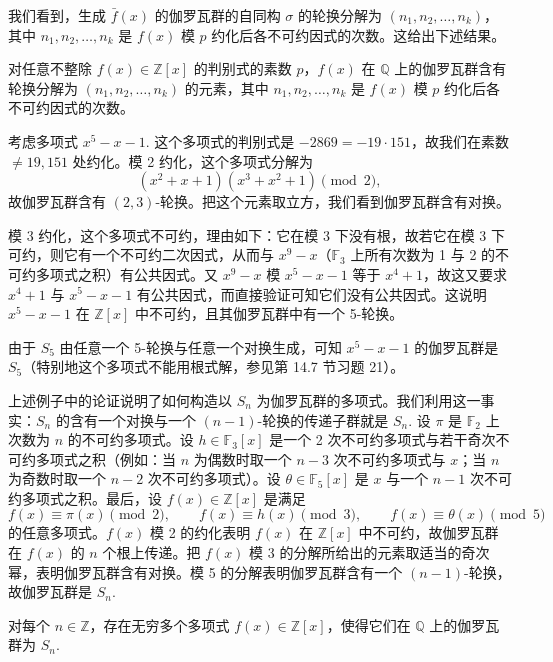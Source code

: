 我们看到，生成 \(\bar f(x)\) 的伽罗瓦群的自同构 \(\sigma\) 的轮换分解为 \((n_1, n_2, \ldots, n_k)\)，其中 \(n_1, n_2, \ldots, n_k\) 是 \(f(x)\) 模 \(p\) 约化后各不可约因式的次数。这给出下述结果。

\begin{corollary}\label{cor:14.41}
对任意不整除 \(f(x) \in \mathbb{Z}[x]\) 的判别式的素数 \(p\)，\(f(x)\) 在 \(\mathbb{Q}\) 上的伽罗瓦群含有轮换分解为 \((n_1, n_2, \ldots, n_k)\) 的元素，其中 \(n_1, n_2, \ldots, n_k\) 是 \(f(x)\) 模 \(p\) 约化后各不可约因式的次数。
\end{corollary}

\begin{example}
考虑多项式 \(x^5-x-1\). 这个多项式的判别式是 \(-2869 = -19\cdot151\)，故我们在素数 \(\neq 19, 151\) 处约化。模 2 约化，这个多项式分解为
\[
(x^2+x+1)(x^3+x^2+1) \pmod 2,
\]
故伽罗瓦群含有 \((2,3)\)-轮换。把这个元素取立方，我们看到伽罗瓦群含有对换。

模 3 约化，这个多项式不可约，理由如下：它在模 3 下没有根，故若它在模 3 下可约，则它有一个不可约二次因式，从而与 \(x^9-x\)（\(\mathbb{F}_3\) 上所有次数为 1 与 2 的不可约多项式之积）有公共因式。又 \(x^9-x\) 模 \(x^5-x-1\) 等于 \(x^4+1\)，故这又要求 \(x^4+1\) 与 \(x^5-x-1\) 有公共因式，而直接验证可知它们没有公共因式。这说明 \(x^5-x-1\) 在 \(\mathbb{Z}[x]\) 中不可约，且其伽罗瓦群中有一个 5-轮换。

由于 \(S_5\) 由任意一个 5-轮换与任意一个对换生成，可知 \(x^5-x-1\) 的伽罗瓦群是 \(S_5\)（特别地这个多项式不能用根式解，参见第 14.7 节习题 21）。
\end{example}

上述例子中的论证说明了如何构造以 \(S_n\) 为伽罗瓦群的多项式。我们利用这一事实：\(S_n\) 的含有一个对换与一个 \((n-1)\)-轮换的传递子群就是 \(S_n\). 设 \(\pi\) 是 \(\mathbb{F}_2\) 上次数为 \(n\) 的不可约多项式。设 \(h \in \mathbb{F}_3[x]\) 是一个 2 次不可约多项式与若干奇次不可约多项式之积（例如：当 \(n\) 为偶数时取一个 \(n-3\) 次不可约多项式与 \(x\)；当 \(n\) 为奇数时取一个 \(n-2\) 次不可约多项式）。设 \(\theta \in \mathbb{F}_5[x]\) 是 \(x\) 与一个 \(n-1\) 次不可约多项式之积。最后，设 \(f(x) \in \mathbb{Z}[x]\) 是满足
\[
f(x) \equiv \pi(x) \pmod 2, \qquad f(x) \equiv h(x) \pmod 3, \qquad f(x) \equiv \theta(x) \pmod 5
\]
的任意多项式。\(f(x)\) 模 2 的约化表明 \(f(x)\) 在 \(\mathbb{Z}[x]\) 中不可约，故伽罗瓦群在 \(f(x)\) 的 \(n\) 个根上传递。把 \(f(x)\) 模 3 的分解所给出的元素取适当的奇次幂，表明伽罗瓦群含有对换。模 5 的分解表明伽罗瓦群含有一个 \((n-1)\)-轮换，故伽罗瓦群是 \(S_n\).

\begin{proposition}\label{pro:14.42}
对每个 \(n \in \mathbb{Z}\)，存在无穷多个多项式 \(f(x) \in \mathbb{Z}[x]\)，使得它们在 \(\mathbb{Q}\) 上的伽罗瓦群为 \(S_n\).
\end{proposition}

